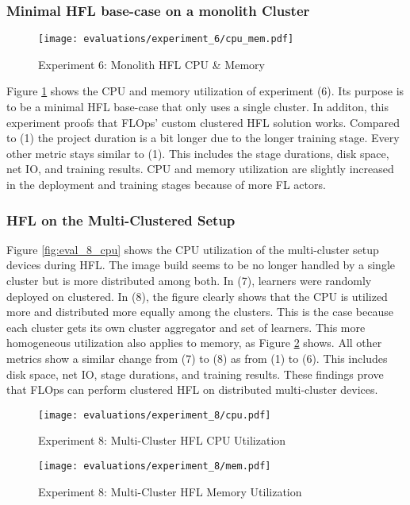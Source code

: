 \pagebreak

\subsubsection{Minimal HFL base-case on a monolith Cluster}

\begin{figure}[H]
    \begin{adjustwidth}{-0.2\paperwidth}{-0.2\paperwidth}
        \centering
        \texttt{[image: evaluations/experiment\_6/cpu\_mem.pdf]}
        \caption{Experiment 6: Monolith HFL CPU \& Memory}
        \label{fig:eval_6_cpu_mem}
    \end{adjustwidth}
\end{figure}

Figure \ref{fig:eval_6_cpu_mem} shows the CPU and memory utilization of experiment (6).
Its purpose is to be a minimal HFL base-case that only uses a single cluster.
In additon, this experiment proofs that FLOps' custom clustered HFL solution works.
Compared to (1) the project duration is a bit longer due to the longer training stage.
Every other metric stays similar to (1).
This includes the stage durations, disk space, net IO, and training results.
CPU and memory utilization are slightly increased in the deployment and training stages because of more FL actors.


\subsubsection{HFL on the Multi-Clustered Setup}

Figure \ref{fig:eval_8_cpu} shows the CPU utilization of the multi-cluster setup devices during HFL.
The image build seems to be no longer handled by a single cluster but is more distributed among both.
In (7), learners were randomly deployed on clustered.
In (8), the figure clearly shows that the CPU is utilized more and distributed more equally among the clusters.
This is the case because each cluster gets its own cluster aggregator and set of learners.
This more homogeneous utilization also applies to memory, as Figure \ref{fig:eval_8_mem} shows.
All other metrics show a similar change from (7) to (8) as from (1) to (6).
This includes disk space, net IO, stage durations, and training results.
These findings prove that FLOps can perform clustered HFL on distributed multi-cluster devices.


\begin{figure}[p]
    \begin{adjustwidth}{-0.2\paperwidth}{-0.2\paperwidth}
        \centering
        \texttt{[image: evaluations/experiment\_8/cpu.pdf]}
        \caption{Experiment 8: Multi-Cluster HFL CPU Utilization}
        \label{fig:eval_8_cpu}
    \end{adjustwidth}

    \begin{adjustwidth}{-0.2\paperwidth}{-0.2\paperwidth}
        \centering
        \texttt{[image: evaluations/experiment\_8/mem.pdf]}
        \caption{Experiment 8: Multi-Cluster HFL Memory Utilization}
        \label{fig:eval_8_mem}
    \end{adjustwidth}
\end{figure}